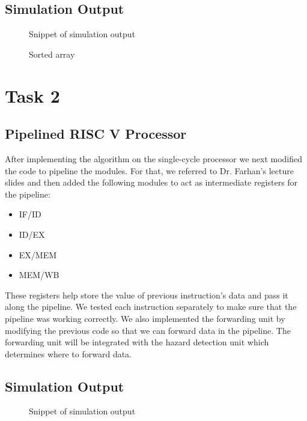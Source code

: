 \documentclass[12pt]{article}
\begin{document}
\subsection{Simulation Output}\label{code1}
    \begin{figure}[htbp!]
        \centering
        \caption{Snippet of simulation output}
    \end{figure}
   
    \begin{figure}[htbp!]
    \begin{center}
            
            \caption{Sorted array}
    \end{center}
    \end{figure}

\section{Task 2}\label{task2}
    \subsection{Pipelined RISC V Processor}\label{task2intro}
    After implementing the algorithm on the single-cycle processor we next modified the code to pipeline the modules. For that, we referred to Dr. Farhan's lecture slides and then added the following modules to act as intermediate registers for the pipeline:
    \begin{itemize}
        \item IF/ID
        \item ID/EX
        \item EX/MEM
        \item MEM/WB
    \end{itemize}
    These registers help store the value of previous instruction's data and pass it along the pipeline. We tested each instruction separately to make sure that the pipeline was working correctly. We also implemented the forwarding unit by modifying the previous code so that we can forward data in the pipeline. The forwarding unit will be integrated with the hazard detection unit which determines where to forward data.
\newpage

\subsection{Simulation Output}\label{code2}
    \begin{figure}[htbp!]
        \centering
        \caption{Snippet of simulation output}
    \end{figure}
\end{document}
